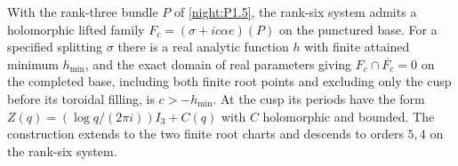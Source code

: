 \begin{theorem}\hypertarget{tag-02QZ}{}\label{night:P1.8}
With the rank-three bundle $P$ of \cref{night:P1.5}, the rank-six
system admits a holomorphic lifted family
$F_c=(\sigma+ic\alpha e)(P)$ on the punctured base.
For a specified splitting $\sigma$ there is a real analytic function
$h$ with finite attained minimum $h_{\min}$, and the exact domain of
real parameters giving $F_c\cap\overline{F_c}=0$ on the completed
base, including both finite root points and excluding only the cusp
before its toroidal filling, is $c>-h_{\min}$.
At the cusp its periods have the form
$Z(q)=(\log q/(2\pi i))I_3+C(q)$ with $C$ holomorphic and bounded.
The construction extends to the two finite root charts and descends to
orders $5,4$ on the rank-six system.
\end{theorem}
